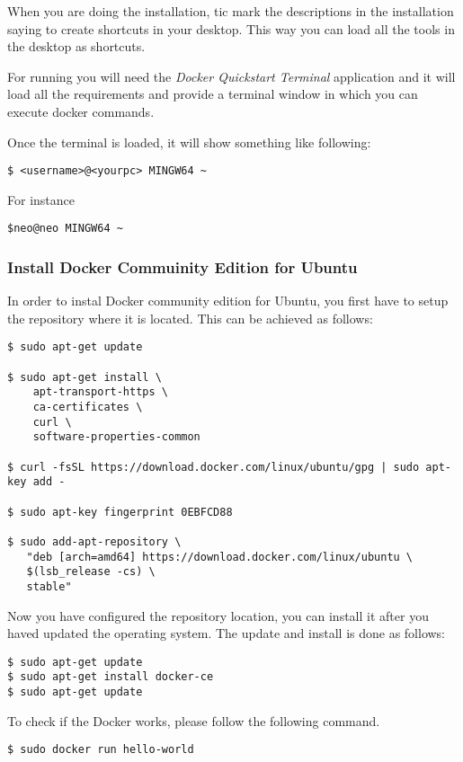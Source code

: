 When you are doing the installation, tic mark the descriptions in the
installation saying to create shortcuts in your desktop. This way you
can load all the tools in the desktop as shortcuts.

For running you will need the \textit{Docker Quickstart Terminal} application
and it will load all the requirements and provide a terminal window in
which you can execute docker commands.

Once the terminal is loaded, it will show something like following:

\begin{verbatim}
$ <username>@<yourpc> MINGW64 ~
\end{verbatim}

For instance

\begin{verbatim}
$neo@neo MINGW64 ~
\end{verbatim}

\subsubsection{Install Docker Commuinity Edition for
Ubuntu}\label{install-docker-commuinity-edition-for-ubuntu}

In order to instal Docker community edition for Ubuntu, you first have
to setup the repository where it is located. This can be achieved as
follows:

\begin{verbatim}
$ sudo apt-get update

$ sudo apt-get install \
    apt-transport-https \
    ca-certificates \
    curl \
    software-properties-common

$ curl -fsSL https://download.docker.com/linux/ubuntu/gpg | sudo apt-key add -

$ sudo apt-key fingerprint 0EBFCD88

$ sudo add-apt-repository \
   "deb [arch=amd64] https://download.docker.com/linux/ubuntu \
   $(lsb_release -cs) \
   stable"
\end{verbatim}

Now you have configured the repository location, you can install it
after you haved updated the operating system. The update and install is
done as follows:

\begin{verbatim}
$ sudo apt-get update
$ sudo apt-get install docker-ce
$ sudo apt-get update
\end{verbatim}

To check if the Docker works, please follow the following command.

\begin{verbatim}
$ sudo docker run hello-world
\end{verbatim}

